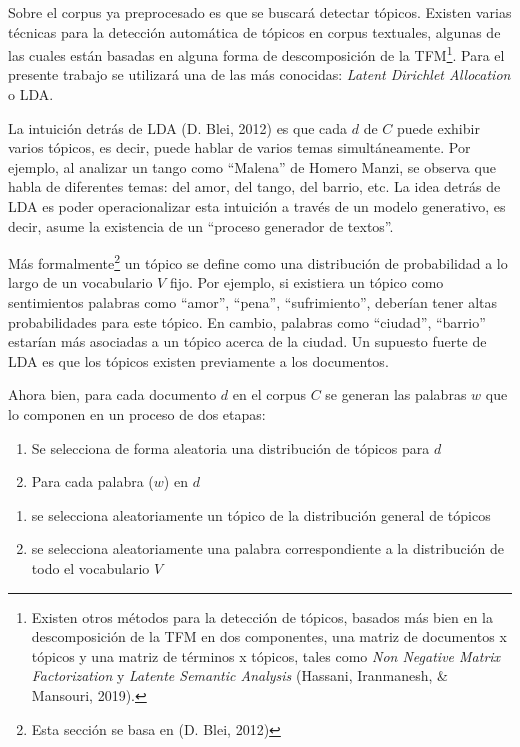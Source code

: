 \documentclass[]{article}
\providecommand{\tightlist}{%
  \setlength{\itemsep}{0pt}\setlength{\parskip}{0pt}}
\let\rmarkdownfootnote\footnote%
\def\footnote{\protect\rmarkdownfootnote}
\begin{document}
Sobre el corpus ya preprocesado es que se buscará detectar tópicos.
Existen varias técnicas para la detección automática de tópicos en
corpus textuales, algunas de las cuales están basadas en alguna forma de
descomposición de la TFM\footnote{Existen otros métodos para la
  detección de tópicos, basados más bien en la descomposición de la TFM
  en dos componentes, una matriz de documentos x tópicos y una matriz de
  términos x tópicos, tales como \emph{Non Negative Matrix
  Factorization} y \emph{Latente Semantic Analysis} (Hassani,
  Iranmanesh, \& Mansouri, 2019).}. Para el presente trabajo se
utilizará una de las más conocidas: \emph{Latent Dirichlet Allocation} o
LDA.

La intuición detrás de LDA (D. Blei, 2012) es que cada \(d\) de \(C\)
puede exhibir varios tópicos, es decir, puede hablar de varios temas
simultáneamente. Por ejemplo, al analizar un tango como ``Malena'' de
Homero Manzi, se observa que habla de diferentes temas: del amor, del
tango, del barrio, etc. La idea detrás de LDA es poder operacionalizar
esta intuición a través de un modelo generativo, es decir, asume la
existencia de un ``proceso generador de textos''.

Más formalmente\footnote{Esta sección se basa en (D. Blei, 2012)} un
tópico se define como una distribución de probabilidad a lo largo de un
vocabulario \(V\) fijo. Por ejemplo, si existiera un tópico como
sentimientos palabras como ``amor'', ``pena'', ``sufrimiento'', deberían
tener altas probabilidades para este tópico. En cambio, palabras como
``ciudad'', ``barrio'' estarían más asociadas a un tópico acerca de la
ciudad. Un supuesto fuerte de LDA es que los tópicos existen previamente
a los documentos.

Ahora bien, para cada documento \(d\) en el corpus \(C\) se generan las
palabras \(w\) que lo componen en un proceso de dos etapas:

\begin{enumerate}
\def\labelenumi{\arabic{enumi}.}
\tightlist
\item
  Se selecciona de forma aleatoria una distribución de tópicos para
  \(d\)
\item
  Para cada palabra (\(w\)) en \(d\)
\end{enumerate}

\begin{enumerate}
\def\labelenumi{\roman{enumi})}
\tightlist
\item
  se selecciona aleatoriamente un tópico de la distribución general de
  tópicos
\item
  se selecciona aleatoriamente una palabra correspondiente a la
  distribución de todo el vocabulario \(V\)
\end{enumerate}
\end{document}
